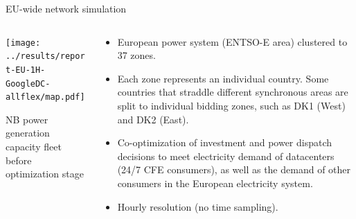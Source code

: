\begin{frame}{EU-wide network simulation}

  \begin{columns}[T]
  \begin{column}{10cm}

  \centering
  \texttt{[image: ../results/report-EU-1H-GoogleDC-allflex/map.pdf]}

  {\scriptsize
  NB power generation capacity fleet before optimization stage\\
  }

  \end{column}

  \begin{column}{6cm}
  {\small
  \begin{itemize}
  \vspace{-.1cm}
  \item European power system (ENTSO-E area) clustered to \alert{37 zones}.
  \item Each zone represents an individual country. Some countries
  that straddle different synchronous areas are split to individual
  bidding zones, such as DK1 (West) and DK2 (East).
  \item \alert{Co-optimization} of investment and power dispatch
  decisions to meet electricity demand of datacenters (24/7 CFE consumers), as well as the demand of other
  consumers in the European electricity system. 
  \item \alert{Hourly resolution} (no time sampling).
  
  \end{itemize}
  }

  \end{column}
  \end{columns}

\end{frame}


